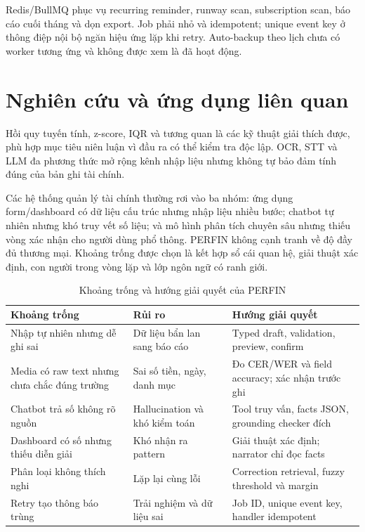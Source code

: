 Redis/BullMQ phục vụ recurring reminder, runway scan, subscription
scan, báo cáo cuối tháng và dọn export. Job phải nhỏ và idempotent;
unique event key ở thông điệp nội bộ ngăn hiệu ứng lặp khi retry.
Auto-backup theo lịch chưa có worker tương ứng và không được xem là đã
hoạt động.

\section{Nghiên cứu và ứng dụng liên quan}

Hồi quy tuyến tính, z-score, IQR và tương quan là các kỹ thuật giải thích
được, phù hợp mục tiêu niên luận vì đầu ra có thể kiểm tra độc lập. OCR,
STT và LLM đa phương thức mở rộng kênh nhập liệu nhưng không tự bảo đảm
tính đúng của bản ghi tài chính.

Các hệ thống quản lý tài chính thường rơi vào ba nhóm: ứng dụng
form/dashboard có dữ liệu cấu trúc nhưng nhập liệu nhiều bước; chatbot
tự nhiên nhưng khó truy vết số liệu; và mô hình phân tích chuyên sâu
nhưng thiếu vòng xác nhận cho người dùng phổ thông. PERFIN không cạnh
tranh về độ đầy đủ thương mại. Khoảng trống được chọn là kết hợp sổ cái
quan hệ, giải thuật xác định, con người trong vòng lặp và lớp ngôn ngữ
có ranh giới.

\begin{table}[htbp]
  \centering
  \caption{Khoảng trống và hướng giải quyết của PERFIN}
  \label{tab:research-gaps}
  \small
  \begin{tabularx}{\textwidth}{|X|X|X|}
    \hline
    \textbf{Khoảng trống} & \textbf{Rủi ro} &
    \textbf{Hướng giải quyết} \\ \hline
    Nhập tự nhiên nhưng dễ ghi sai & Dữ liệu bẩn lan sang báo cáo &
    Typed draft, validation, preview, confirm \\ \hline
    Media có raw text nhưng chưa chắc đúng trường & Sai số tiền, ngày,
    danh mục & Đo CER/WER và field accuracy; xác nhận trước ghi \\
    \hline
    Chatbot trả số không rõ nguồn & Hallucination và khó kiểm toán &
    Tool truy vấn, facts JSON, grounding checker đích \\ \hline
    Dashboard có số nhưng thiếu diễn giải & Khó nhận ra pattern & Giải
    thuật xác định; narrator chỉ đọc facts \\ \hline
    Phân loại không thích nghi & Lặp lại cùng lỗi & Correction
    retrieval, fuzzy threshold và margin \\ \hline
    Retry tạo thông báo trùng & Trải nghiệm và dữ liệu sai & Job ID,
    unique event key, handler idempotent \\ \hline
  \end{tabularx}
\end{table}
